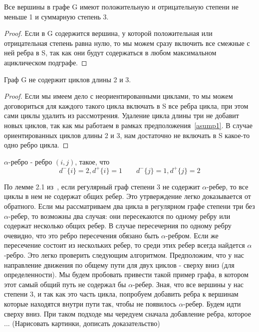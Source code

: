 \begin{assumption}\label{asump1}
    Все вершины в графе G имеют положительную и отрицательную степени не меньше
    1 и суммарную степень 3.
\end{assumption}

\begin{proof}
    Если в G содержится вершина, у которой положительная или отрицательная
    степень равна нулю, то мы можем сразу включить все смежные с ней ребра 
    в S, так как они будут содержаться в любом максимальном ациклическом
    подграфе.
\end{proof}

\begin{assumption}
    Граф G не содержит циклов длины 2 и 3.
\end{assumption}

\begin{proof}
    Если мы имеем дело с неориентированными циклами, то мы можем договориться
    для каждого такого цикла включать в S все ребра цикла, при этом
    сами циклы удалить из рассмотрения. Удаление цикла длины три не добавит
    новых циклов, так как мы работаем в рамках предположения~\ref{asump1}.
    В случае ориентированных циклов длины 2 и 3, нам достаточно не включать в S 
    какое-то одно ребро цикла.
\end{proof}

\begin{definition}
    $\alpha$-ребро - ребро $(i,j)$, такое, что 
    $$d^-\{i\} = 2, d^+\{i\}=1 \qquad d^-\{j\} = 1, d^+\{j\}=2$$
\end{definition}

По лемме 2.1 из~\cite{digraph_3}, если регулярный граф степени 3 не содержит
$\alpha$-ребер, то все циклы в нем не содержат общих ребер. Это утрверждение
легко доказывается от обратного. Если мы рассматриваем два цикла в регулярном 
графе степени три без $\alpha$-ребер, то возможны два случая: они пересекаются
по одному ребру или содержат несколько общих ребер. В случае пересечерния по 
одному ребру очевидно, что это ребро пересечения обязано быть $\alpha$-ребром.
Если же пересечение состоит из нескольких ребер, то среди этих ребер всегда 
найдется $\alpha$-ребро. Это легко проверить следующим алгоритмом. Предположим,
что у нас направление движения по общему пути для двух циклов - сверху вниз
(для определенности). Мы будем пробовать привести такой пример графа, в котором
этот самый общий путь не содержал бы $\alpha$-ребер. Зная, что все вершины 
у нас степени 3, и так как это часть цикла, попробуем добавить ребра к вершинам
которые находятся внутри пути так, чтобы не появилось $\alpha$-ребер. Будем 
идти сверху вниз. При таком подходе мы чередуем сначала добавление ребра, 
которое ... (Нарисовать картинки, дописать доказательство)

